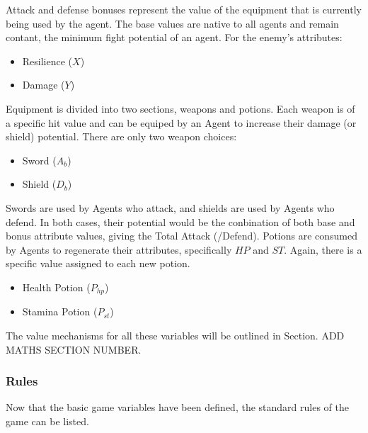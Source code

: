 Attack and defense bonuses represent the value of the equipment that is currently being used by the agent. The base values are native to all agents and remain contant, the minimum fight potential of an agent. For the enemy's attributes:

\begin{itemize}
    \item Resilience ($X$)
    \item Damage ($Y$)
\end{itemize}

Equipment is divided into two sections, weapons and potions. Each weapon is of a specific hit value and can be equiped by an Agent to increase their damage (or shield) potential. There are only two weapon choices:

\begin{itemize}
    \item Sword ($A_b$)
    \item Shield ($D_b$)
\end{itemize}

Swords are used by Agents who attack, and shields are used by Agents who defend. In both cases, their potential would be the conbination of both base and bonus attribute values, giving the Total Attack (/Defend). Potions are consumed by Agents to regenerate their attributes, specifically $HP$ and $ST$. Again, there is a specific value assigned to each new potion. 

\begin{itemize}
    \item Health Potion ($P_{hp}$)
    \item Stamina Potion ($P_{st}$)
\end{itemize}

The value mechanisms for all these variables will be outlined in Section. ADD MATHS SECTION NUMBER. 

\subsubsection{Rules}
Now that the basic game variables have been defined, the standard rules of the game can be listed. 

